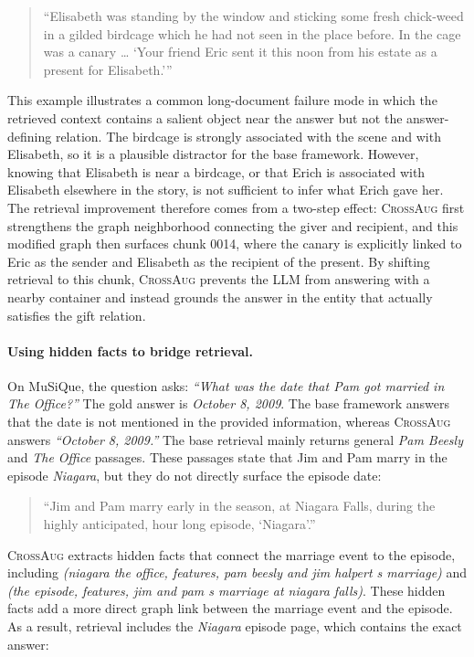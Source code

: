 \documentclass[11pt]{article}
\newcommand{\ours}{\textsc{CrossAug}\xspace}
\begin{document}
\begin{quote}
\small
``Elisabeth was standing by the window and sticking some fresh chick-weed in a gilded birdcage which he had not seen in the place before. In the cage was a canary \ldots{} `Your friend Eric sent it this noon from his estate as a present for Elisabeth.'''
\end{quote}

This example illustrates a common long-document failure mode in which the retrieved context contains a salient object near the answer but not the answer-defining relation. The birdcage is strongly associated with the scene and with Elisabeth, so it is a plausible distractor for the base framework. However, knowing that Elisabeth is near a birdcage, or that Erich is associated with Elisabeth elsewhere in the story, is not sufficient to infer what Erich gave her. The retrieval improvement therefore comes from a two-step effect: \ours first strengthens the graph neighborhood connecting the giver and recipient, and this modified graph then surfaces chunk 0014, where the canary is explicitly linked to Eric as the sender and Elisabeth as the recipient of the present. By shifting retrieval to this chunk, \ours prevents the LLM from answering with a nearby container and instead grounds the answer in the entity that actually satisfies the gift relation.

\paragraph{Using hidden facts to bridge retrieval.}
On MuSiQue, the question asks: \textit{``What was the date that Pam got married in The Office?''} The gold answer is \textit{October 8, 2009}. The base framework answers that the date is not mentioned in the provided information, whereas \ours answers \textit{``October 8, 2009.''} The base retrieval mainly returns general \textit{Pam Beesly} and \textit{The Office} passages. These passages state that Jim and Pam marry in the episode \textit{Niagara}, but they do not directly surface the episode date:

\begin{quote}
\small
``Jim and Pam marry early in the season, at Niagara Falls, during the highly anticipated, hour long episode, `Niagara'.''
\end{quote}

\ours extracts hidden facts that connect the marriage event to the episode, including \textit{(niagara the office, features, pam beesly and jim halpert s marriage)} and \textit{(the episode, features, jim and pam s marriage at niagara falls)}. These hidden facts add a more direct graph link between the marriage event and the episode. As a result, retrieval includes the \textit{Niagara} episode page, which contains the exact answer:
\end{document}
